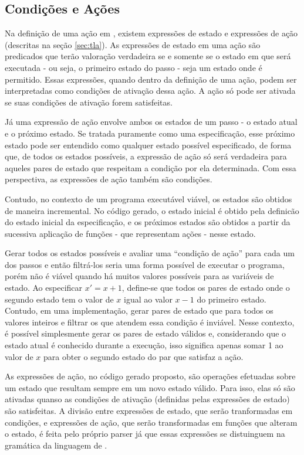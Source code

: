 \subsection{Condições e Ações}
\label{sec:condicoes}

Na definição de uma ação em \TLAA, existem expressões de estado e expressões de
ação (descritas na seção \ref{sec:tla}). As expressões de estado em uma ação
\FANCYA são predicados que terão valoração verdadeira se e somente se o estado em que \FANCYA
será executada - ou seja, o primeiro estado do passo - seja um estado onde
\FANCYA é permitido. Essas expressões, quando dentro da definição de uma ação,
podem ser interpretadas como condições de ativação dessa ação. A ação só pode ser ativada
se suas condições de ativação forem satisfeitas.

Já uma expressão de ação envolve ambos os estados de um passo - o estado atual e
o próximo estado. Se tratada puramente como uma especificação, esse próximo
estado pode ser entendido como qualquer estado possível especificado, de forma
que, de todos os estados possíveis, a expressão de ação só será verdadeira para
aqueles pares de estado que respeitam a condição por ela determinada. Com essa
perspectiva, as expressões de ação também são condições.

Contudo, no contexto de um programa executável viável, os estados são obtidos de
maneira incremental. No código gerado, o estado inicial é obtido pela definicão
do estado inicial da especificação, e os próximos estados são obtidos a partir
da sucessiva aplicação de funções - que representam ações - nesse estado.

Gerar todos os estados possíveis e avaliar uma ``condição de ação'' para cada um dos
passos e então filtrá-los seria uma forma possível de executar o programa, porém
não é viável quando há muitos valores possíveis para as variáveis de estado. Ao
especificar $x' = x + 1$, define-se que todos os pares de estado onde o segundo estado tem o
valor de $x$ igual ao valor $x - 1$ do primeiro estado. Contudo, em uma
implementação, gerar pares de estado que para todos os valores
inteiros e filtrar os que atendem essa condição é
inviável. Nesse contexto, é possível simplesmente gerar os pares de estado válidos e,
considerando que o estado atual é conhecido durante a execução, isso significa apenas
somar 1 ao valor de $x$ para obter o segundo estado do par que satisfaz a ação.

As expressões de ação, no código gerado proposto, são operações efetuadas sobre
um estado que resultam sempre em um novo estado válido. Para isso, elas só são
ativadas quanso as condições de ativação (definidas pelas expressões
de estado) são satisfeitas. A divisão
entre expressões de estado, que serão tranformadas em condições, e expressões de
ação, que serão transformadas em funções que alteram o estado, é feita pelo
próprio parser já que essas expressões se distuinguem na gramática da linguagem
de \TLAA.

